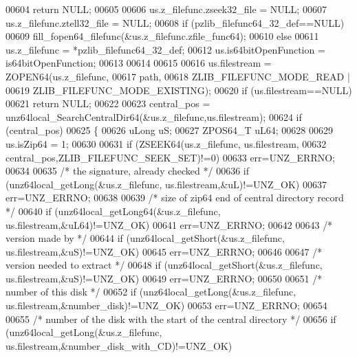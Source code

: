 \begin{DoxyCode}
00604         \textcolor{keywordflow}{return} NULL;
00605 
00606     us.z\_filefunc.zseek32\_file = NULL;
00607     us.z\_filefunc.ztell32\_file = NULL;
00608     \textcolor{keywordflow}{if} (pzlib\_filefunc64\_32\_def==NULL)
00609         fill\_fopen64\_filefunc(&us.z\_filefunc.zfile\_func64);
00610     \textcolor{keywordflow}{else}
00611         us.z\_filefunc = *pzlib\_filefunc64\_32\_def;
00612     us.is64bitOpenFunction = is64bitOpenFunction;
00613 
00614 
00615 
00616     us.filestream = ZOPEN64(us.z\_filefunc,
00617                                                  path,
00618                                                  ZLIB\_FILEFUNC\_MODE\_READ |
00619                                                  ZLIB\_FILEFUNC\_MODE\_EXISTING);
00620     \textcolor{keywordflow}{if} (us.filestream==NULL)
00621         \textcolor{keywordflow}{return} NULL;
00622 
00623     central\_pos = unz64local\_SearchCentralDir64(&us.z\_filefunc,us.filestream);
00624     \textcolor{keywordflow}{if} (central\_pos)
00625     \{
00626         uLong uS;
00627         ZPOS64\_T uL64;
00628 
00629         us.isZip64 = 1;
00630 
00631         \textcolor{keywordflow}{if} (ZSEEK64(us.z\_filefunc, us.filestream,
00632                                       central\_pos,ZLIB\_FILEFUNC\_SEEK\_SET)!=0)
00633         err=UNZ\_ERRNO;
00634 
00635         \textcolor{comment}{/* the signature, already checked */}
00636         \textcolor{keywordflow}{if} (unz64local\_getLong(&us.z\_filefunc, us.filestream,&uL)!=UNZ\_OK)
00637             err=UNZ\_ERRNO;
00638 
00639         \textcolor{comment}{/* size of zip64 end of central directory record */}
00640         \textcolor{keywordflow}{if} (unz64local\_getLong64(&us.z\_filefunc, us.filestream,&uL64)!=UNZ\_OK)
00641             err=UNZ\_ERRNO;
00642 
00643         \textcolor{comment}{/* version made by */}
00644         \textcolor{keywordflow}{if} (unz64local\_getShort(&us.z\_filefunc, us.filestream,&uS)!=UNZ\_OK)
00645             err=UNZ\_ERRNO;
00646 
00647         \textcolor{comment}{/* version needed to extract */}
00648         \textcolor{keywordflow}{if} (unz64local\_getShort(&us.z\_filefunc, us.filestream,&uS)!=UNZ\_OK)
00649             err=UNZ\_ERRNO;
00650 
00651         \textcolor{comment}{/* number of this disk */}
00652         \textcolor{keywordflow}{if} (unz64local\_getLong(&us.z\_filefunc, us.filestream,&number\_disk)!=UNZ\_OK)
00653             err=UNZ\_ERRNO;
00654 
00655         \textcolor{comment}{/* number of the disk with the start of the central directory */}
00656         \textcolor{keywordflow}{if} (unz64local\_getLong(&us.z\_filefunc, us.filestream,&number\_disk\_with\_CD)!=UNZ\_OK)

\end{DoxyCode}
